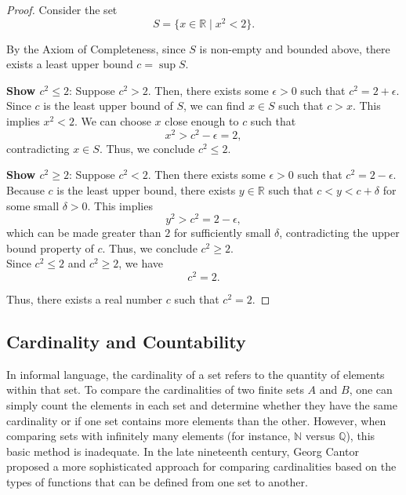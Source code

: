 \begin{proof}
    Consider the set 
   \[
   S = \{ x \in \mathbb{R} \mid x^2 < 2 \}.
   \]

   By the Axiom of Completeness, since \( S \) is non-empty and bounded above, there exists a least upper bound \( c = \sup S \).

    \textbf{Show \( c^2 \leq 2 \)}: Suppose \( c^2 > 2 \). Then, there exists some \( \epsilon > 0 \) such that \( c^2 = 2 + \epsilon \). Since \( c \) is the least upper bound of \( S \), we can find \( x \in S \) such that \( c > x \). This implies \( x^2 < 2 \). We can choose \( x \) close enough to \( c \) such that 
     \[
     x^2 > c^2 - \epsilon = 2,
     \]
     contradicting \( x \in S \). Thus, we conclude \( c^2 \leq 2 \).

   \textbf{Show \( c^2 \geq 2 \)}: Suppose \( c^2 < 2 \). Then there exists some \( \epsilon > 0 \) such that \( c^2 = 2 - \epsilon \). Because \( c \) is the least upper bound, there exists \( y \in \mathbb{R} \) such that \( c < y < c + \delta \) for some small \( \delta > 0 \). This implies 
     \[
     y^2 > c^2 = 2 - \epsilon,
     \]
     which can be made greater than \( 2 \) for sufficiently small \( \delta \), contradicting the upper bound property of \( c \). Thus, we conclude \( c^2 \geq 2 \). \\

     Since \( c^2 \leq 2 \) and \( c^2 \geq 2 \), we have 
   \[
   c^2 = 2.
   \]

Thus, there exists a real number \( c \) such that \( c^2 = 2 \).
\end{proof}

\subsection{Cardinality and Countability}

In informal language, the cardinality of a set refers to the quantity of elements within that set. To compare the cardinalities of two finite sets \(A\) and \(B\), one can simply count the elements in each set and determine whether they have the same cardinality or if one set contains more elements than the other. However, when comparing sets with infinitely many elements (for instance, \(\mathbb{N}\) versus \(\mathbb{Q}\)), this basic method is inadequate. In the late nineteenth century, Georg Cantor proposed a more sophisticated approach for comparing cardinalities based on the types of functions that can be defined from one set to another.

